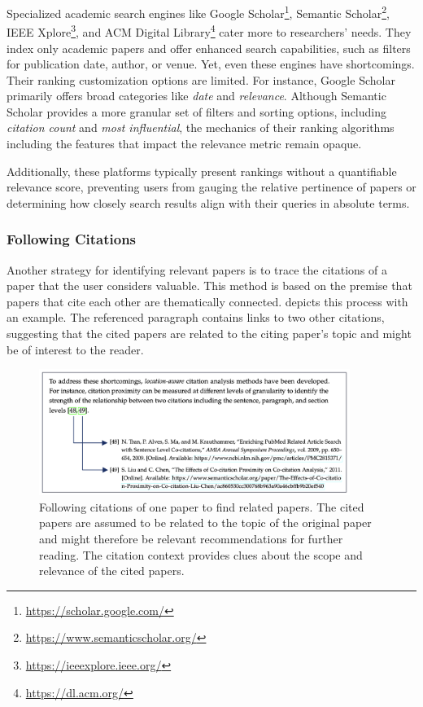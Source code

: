 Specialized academic search engines like Google Scholar\footnote{\url{https://scholar.google.com/}}, Semantic Scholar\footnote{\url{https://www.semanticscholar.org/}}, IEEE Xplore\footnote{\url{https://ieeexplore.ieee.org/}}, and ACM Digital Library\footnote{\url{https://dl.acm.org/}} cater more to researchers' needs. They index only academic papers and offer enhanced search capabilities, such as filters for publication date, author, or venue. Yet, even these engines have shortcomings. Their ranking customization options are limited. For instance, Google Scholar primarily offers broad categories like \emph{date} and \emph{relevance}. Although Semantic Scholar provides a more granular set of filters and sorting options, including \emph{citation count} and \emph{most influential}, the mechanics of their ranking algorithms including the features that impact the relevance metric remain opaque.

Additionally, these platforms typically present rankings without a quantifiable relevance score, preventing users from gauging the relative pertinence of papers or determining how closely search results align with their queries in absolute terms.

\subsubsection*{Following Citations}

Another strategy for identifying relevant papers is to trace the citations of a paper that the user considers valuable. This method is based on the premise that papers that cite each other are thematically connected.
 depicts this process with an example. The referenced paragraph contains links to two other citations, suggesting that the cited papers are related to the citing paper's topic and might be of interest to the reader.

\begin{figure}[htb!]
    \centering
    \includegraphics[width=0.9\textwidth]{screenshots/following_citations.png}
    \caption[Following Citations]{Following citations of one paper to find related papers. The cited papers are assumed to be related to the topic of the original paper and might therefore be relevant recommendations for further reading. The citation context provides clues about the scope and relevance of the cited papers.}
    \label{fig:following-citations}
\end{figure}

